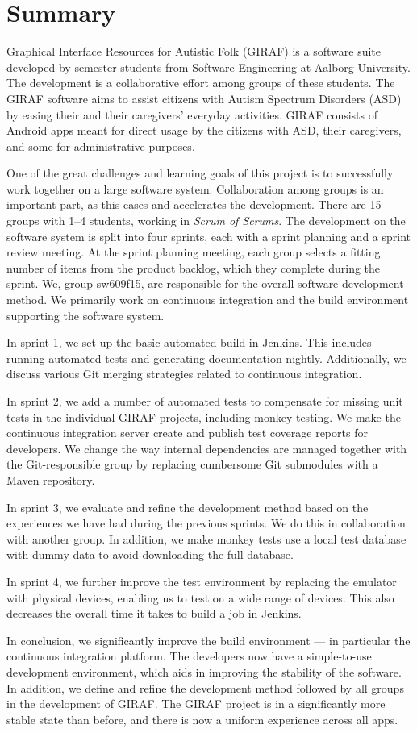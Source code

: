 \chapter*{Summary}
Graphical Interface Resources for Autistic Folk (GIRAF) is a software suite developed by  semester students from Software Engineering at Aalborg University. The development is a collaborative effort among groups of these students. The GIRAF software aims to assist citizens with Autism Spectrum Disorders (ASD) by easing their and their caregivers' everyday activities. GIRAF consists of Android apps meant for direct usage by the citizens with ASD, their caregivers, and some for administrative purposes.

One of the great challenges and learning goals of this project is to successfully work together on a large software system. Collaboration among groups is an important part, as this eases and accelerates the development. There are 15 groups with 1--4 students, working in \emph{Scrum of Scrums}. The development on the software system is split into four sprints, each with a sprint planning and a sprint review meeting. At the sprint planning meeting, each group selects a fitting number of items from the product backlog, which they complete during the sprint. We, group sw609f15, are responsible for the overall software development method. We primarily work on continuous integration and the build environment supporting the software system.

In sprint 1, we set up the basic automated build in Jenkins. This includes running automated tests and generating documentation nightly. Additionally, we discuss various Git merging strategies related to continuous integration.

In sprint 2, we add a number of automated tests to compensate for missing unit tests in the individual GIRAF projects, including monkey testing. We make the continuous integration server create and publish test coverage reports for developers. We change the way internal dependencies are managed together with the Git-responsible group by replacing cumbersome Git submodules with a Maven repository.

In sprint 3, we evaluate and refine the development method based on the experiences we have had during the previous sprints. We do this in collaboration with another group. In addition, we make monkey tests use a local test database with dummy data to avoid downloading the full database.

In sprint 4, we further improve the test environment by replacing the emulator with physical devices, enabling us to test on a wide range of devices. This also decreases the overall time it takes to build a job in Jenkins.

In conclusion, we significantly improve the build environment --- in particular the continuous integration platform. The developers now have a simple-to-use development environment, which aids in improving the stability of the software. In addition, we define and refine the development method followed by all groups in the development of GIRAF\@. The GIRAF project is in a significantly more stable state than before, and there is now a uniform experience across all apps.